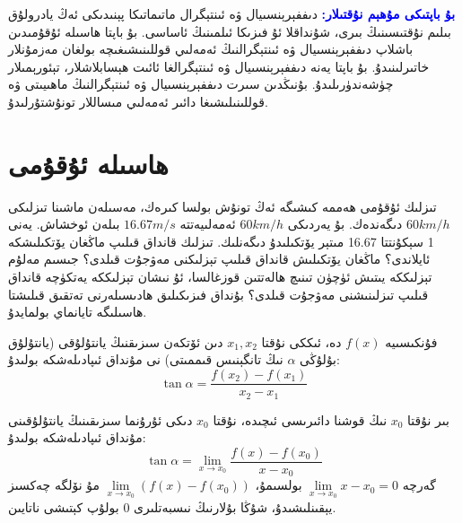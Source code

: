 \par\bigskip
\begin{tcolorbox}
	\textcolor{blue}{\textbf{بۇ باپتىكى مۇھېم نۇقتىلار:}}
دىففېرېنسىيال ۋە ئىنتېگرال ماتىماتىكا پېنىدىكى ئەڭ يادرولۇق بىلىم نۇقتىسىنىڭ بىرى، شۇنداقلا ئۇ فىزىكا ئىلمىنىڭ ئاساسى. بۇ باپتا ھاسىلە ئۇقۇمىدىن باشلاپ دىففېرېنسىيال ۋە ئىنتېگرالنىڭ ئەمەلىي قوللىنىشىغىچە بولغان مەزمۇنلار خاتىرلىنىدۇ. بۇ باپتا يەنە دىففېرېنسىيال ۋە ئىنتېگرالغا ئائىت ھېسابلاشلار، تېئورېمىلار چۈشەندۈرىلىدۇ. بۇنىڭدىن سىرت دىففېرېنسىيال ۋە ئىنتېگرالنىڭ ماھىيىتى ۋە قوللىنىلىشىغا دائىر ئەمەلىي مىساللار تونۇشتۇرلىدۇ.
\end{tcolorbox}

\section{ھاسىلە ئۇقۇمى}
تىزلىك ئۇقۇمى ھەممە كىشىگە ئەڭ تونۇش بولسا كىرەك، مەسىلەن ماشىنا تىزلىكى $60 km/h$ دىگەندەك. بۇ يەردىكى  $60 km/h$ ئەمەلىيەتتە  $16.67 m/s$ بىلەن ئوخشاش. يەنى 1 سېكۇنتتا 16.67 مىتېر يۆتكىلىدۇ دىگەنلىك. تىزلىك قانداق قىلىپ ماڭغان يۆتكىلىشكە ئايلاندى؟ ماڭغان يۆتكىلىش قانداق قىلىپ تېزلىكنى مەۋجۇت قىلدى؟ جىسىم مەلۇم تېزلىككە يىتىش ئۈچۈن تىنىچ ھالەتتىن قوزغالسا، ئۇ نىشان تېزلىككە يەتكۈچە قانداق قىلىپ تىزلىنىشنى مەۋجۇت قىلدى؟ بۇنداق فىزىكىلىق ھادىسىلەرنى تەتقىق قىلىشتا ھاسىلىگە تايانماي بولمايدۇ.

فۇنكىسىيە 
$f(x)$
دە، ئىككى نۇقتا
$x_1,x_2$
دىن ئۆتكەن سىزىقنىڭ يانتۇلۇقى (يانتۇلۇق بۇلۇڭى $\alpha$ نىڭ تانگېنىس قىممىتى)
نى مۇنداق ئىپادىلەشكە بولىدۇ:
$$\tan\alpha = \frac{f(x_2)-f(x_1)}{x_2-x_1}$$

 بىر نۇقتا
$x_0$
 نىڭ قوشنا دائىرىسى  ئىچىدە، نۇقتا
$x_0$
دىكى ئۇرۇنما سىزىقىنىڭ يانتۇلۇقىنى مۇنداق ئىپادىلەشكە بولىدۇ:
$$\tan\alpha = \lim\limits_{x\to x_0}\frac{f(x)-f(x_0)}{x-x_0}$$
گەرچە 
$\lim\limits_{x\to x_0}{x-x_0} =0$
بولسىمۇ،
$\lim\limits_{x\to x_0}{(f(x)-f(x_0))}$
مۇ نۆلگە چەكسىز يېقىنلىشىدۇ، شۇڭا بۇلارنىڭ نىسبەتلىرى 0 بولۇپ كېتىشى ناتايىن.


